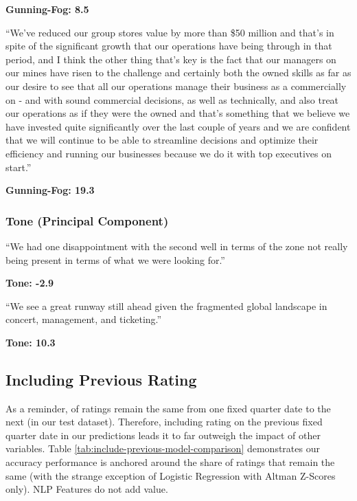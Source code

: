 \documentclass{article}[11pt]
\begin{document}
    \textbf{Gunning-Fog: 8.5}

    \begin{em}
        ``We've reduced our group stores value by more than \$50 million and that’s in spite of the significant growth that our operations have being through in that period, and I think the other thing that’s key is the fact that our managers on our mines have risen to the challenge and certainly both the owned skills as far as our desire to see that all our operations manage their business as a commercially on - and with sound commercial decisions, as well as technically, and also treat our operations as if they were the owned and that’s something that we believe we have invested quite significantly over the last couple of years and we are confident that we will continue to be able to streamline decisions and optimize their efficiency and running our businesses because we do it with top executives on start.''
    \end{em}

    \textbf{Gunning-Fog: 19.3}

    \subsubsection{Tone (Principal Component)}

    \begin{em}
        ``We had one disappointment with the second well in terms of the zone not really being present in terms of what we were looking for.''
    \end{em}

    \textbf{Tone: -2.9}

    \begin{em}
        ``We see a great runway still ahead given the fragmented global landscape in concert, management, and ticketing.''
    \end{em}

    \textbf{Tone: 10.3}

    \clearpage
    \newpage

    \subsection{Including Previous Rating}

    \label{sec:include-previous-rating}

    As a reminder, \shareNotChanges \space of ratings remain the same from one fixed quarter date to the next (\shareNotChangesTest \space in our test dataset). Therefore, including rating on the previous fixed quarter date in our predictions leads it to far outweigh the impact of other variables. Table \ref{tab:include-previous-model-comparison} demonstrates our accuracy performance is anchored around the share of ratings that remain the same (with the strange exception of Logistic Regression with Altman Z-Scores only). NLP Features do not add value.
\end{document}
